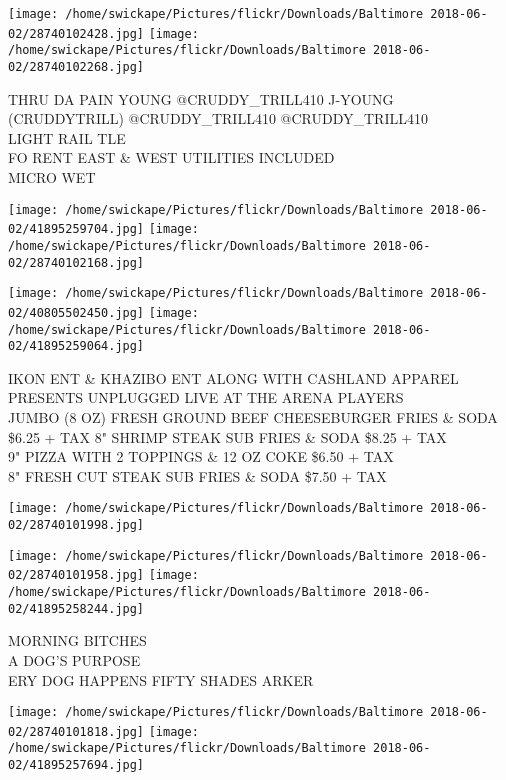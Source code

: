 \documentclass[10pt,letterpaper]{article}
\begin{document}
\texttt{[image: /home/swickape/Pictures/flickr/Downloads/Baltimore 2018-06-02/28740102428.jpg]}
\texttt{[image: /home/swickape/Pictures/flickr/Downloads/Baltimore 2018-06-02/28740102268.jpg]}

THRU DA PAIN YOUNG @CRUDDY\_TRILL410 J{-}YOUNG (CRUDDYTRILL) @CRUDDY\_TRILL410 @CRUDDY\_TRILL410\\
LIGHT RAIL TLE\\
FO RENT EAST \& WEST UTILITIES INCLUDED\\
MICRO WET\\
\pagebreak

\texttt{[image: /home/swickape/Pictures/flickr/Downloads/Baltimore 2018-06-02/41895259704.jpg]}
\texttt{[image: /home/swickape/Pictures/flickr/Downloads/Baltimore 2018-06-02/28740102168.jpg]}

\texttt{[image: /home/swickape/Pictures/flickr/Downloads/Baltimore 2018-06-02/40805502450.jpg]}
\texttt{[image: /home/swickape/Pictures/flickr/Downloads/Baltimore 2018-06-02/41895259064.jpg]}

IKON ENT \& KHAZIBO ENT ALONG WITH CASHLAND APPAREL PRESENTS UNPLUGGED LIVE AT THE ARENA PLAYERS\\
JUMBO (8 OZ) FRESH GROUND BEEF CHEESEBURGER FRIES \& SODA \$6.25 + TAX 8" SHRIMP STEAK SUB FRIES \& SODA \$8.25 + TAX\\
9" PIZZA WITH 2 TOPPINGS \& 12 OZ COKE \$6.50 + TAX\\
8" FRESH CUT STEAK SUB FRIES \& SODA \$7.50 + TAX\\
\pagebreak

\texttt{[image: /home/swickape/Pictures/flickr/Downloads/Baltimore 2018-06-02/28740101998.jpg]}

\vspace{0.25in}
\texttt{[image: /home/swickape/Pictures/flickr/Downloads/Baltimore 2018-06-02/28740101958.jpg]}
\texttt{[image: /home/swickape/Pictures/flickr/Downloads/Baltimore 2018-06-02/41895258244.jpg]}

MORNING BITCHES\\
A DOG'S PURPOSE\\
ERY DOG HAPPENS FIFTY SHADES ARKER\\
\pagebreak

\texttt{[image: /home/swickape/Pictures/flickr/Downloads/Baltimore 2018-06-02/28740101818.jpg]}
\texttt{[image: /home/swickape/Pictures/flickr/Downloads/Baltimore 2018-06-02/41895257694.jpg]}
\end{document}
